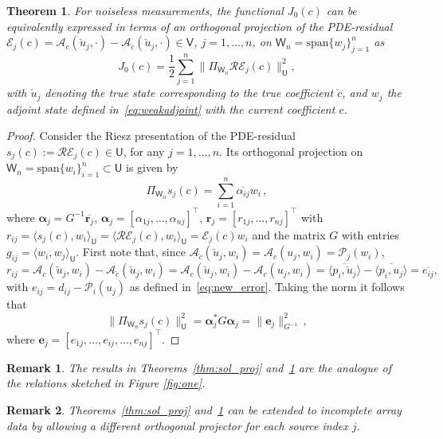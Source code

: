 \documentclass[12pt]{amsart}
\newcommand{\U}{\mathsf{U}}
\newtheorem{thm}{Theorem}
\newtheorem{rem}{Remark}
\begin{document}
\begin{thm}\label{thm:PDE_proj}
For noiseless measurements, the functional $J_0(c)$ can be equivalently expressed in terms of an orthogonal projection of the PDE-residual $\mathcal{E}_j(c) = \mathcal{A}_c(\check{u}_j,\cdot) -  \mathcal{A}_{\check{c}}(\check{u}_j,\cdot) \in \mathsf{V}$, $j=1,\ldots,n$, on $\mathsf{W}_n = \text{span}\{w_j\}_{j=1}^n$ as
\[
J_0(c) = {\textstyle\frac{1}{2}}\sum_{j=1}^n \|\Pi_{\mathsf{W}_n}\mathcal{R}\mathcal{E}_j(c)\|_{\mathsf{U}}^2,
\]
with $\check{u}_j$ denoting the true state corresponding to the true coefficient $\check{c}$, and $w_j$ the adjoint state defined in~\eqref{eq:weakadjoint} with the current coefficient $c$.
\end{thm}
\begin{proof}
Consider the Riesz presentation of the PDE-residual $s_j(c) := \mathcal{R}\mathcal{E}_j(c) \in \U $, for any $j= 1,\ldots, n$. Its orthogonal projection on $\mathsf{W}_n = \text{span}\{w_i\}_{i=1}^n \subset \U$ is given by
\[
\Pi_{\mathsf{W}_n} s_j(c) = \sum_{i=1}^n \overline{\alpha_{ij}} w_i\,,
\]
where $\boldsymbol{\alpha}_{j} = G^{-1}\overline{\mathbf{r}_j}$, $\boldsymbol{\alpha}_{j} = [{\alpha}_{1j},\ldots, {\alpha}_{nj}]^\top$, $\mathbf{r}_{j} = [{r}_{1j},\ldots, {r}_{nj}]^\top$  with $r_{ij} = \langle s_j(c),w_i\rangle_{\mathsf{U}} =  \langle \mathcal{R}\mathcal{E}_j(c) , w_i\rangle_{\U} = \mathcal{E}_j(c) w_i$ and the matrix $G$ with entries $g_{ij}=\langle w_i, w_j\rangle_\mathsf{U}$. First note that, since $\mathcal{A}_{\check{c}}(\check{u}_j,w_i)  = \mathcal{A}_{c}({u}_j,w_i)  = \mathcal{P}_j(w_i)$,
\[
r_{ij} = \mathcal{A}_c(\check{u}_j,w_i) -  \mathcal{A}_{\check{c}}(\check{u}_j,w_i) = \mathcal{A}_c(\check{u}_j,w_i) -  \mathcal{A}_{c}({u}_j,w_i) = \overline{\langle p_i,\check{u}_j\rangle} - \overline{\langle p_i,u_j\rangle} = \overline{e_{ij}},
\]
with $e_{ij} =d_{ij} -  \mathcal{P}_i(u_j) $ as defined in~\eqref{eq:new_error}. Taking the norm it follows that 
\[
\|\Pi_{\mathsf{W}_n} s_j(c)\|_{\mathsf{U}}^2 = \boldsymbol{\alpha}_j^*G\boldsymbol{\alpha}_j = \|\mathbf{e}_j\|^2_{G^{-1}}\,,
\]
where $\mathbf{e}_j = [e_{1j}, \ldots, e_{ij},\ldots, e_{nj}]^\top$.
\end{proof}
\begin{rem}
The results in  Theorems~\ref{thm:sol_proj} and~\ref{thm:PDE_proj} are the analogue of the relations sketched in Figure \ref{fig:one}.
\end{rem}
{\begin{rem}Theorems~\ref{thm:sol_proj} and~\ref{thm:PDE_proj} can be extended to incomplete array data by allowing a different orthogonal projector for each source index $j$.
\end{rem}}
\end{document}
